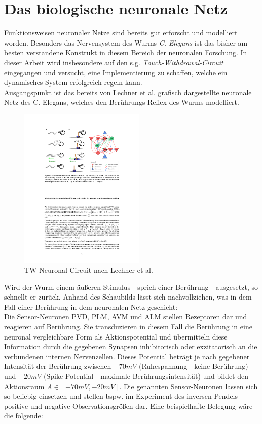 \section{Das biologische neuronale Netz}
\label{sec:neuro_netz}
	Funktionsweisen neuronaler Netze sind bereits gut erforscht und modelliert worden. Besonders das Nervensystem des Wurms \textit{C. Elegans} \cite{CElegans} ist das bisher am besten verstandene Konstrukt in diesem Bereich der neuronalen Forschung. In dieser Arbeit wird insbesondere auf den s.g. \textit{Touch-Withdrawal-Circuit} eingegangen und versucht, eine Implementierung zu schaffen, welche ein dynamisches System erfolgreich regeln kann.\\
	Ausgangspunkt ist das bereits von Lechner et al. \cite{WormLevelRL} grafisch dargestellte neuronale Netz des C. Elegans, welches den Berührungs-Reflex des Wurms modelliert.
	\begin{figure}[!h] %
		\centering
		\includegraphics[width=6cm]{figures/chap_neuron/Orig_TW_Circuit.pdf}
		\caption{TW-Neuronal-Circuit nach Lechner et al. \cite{WormLevelRL}}
		\label{fig:01_TW-Circuit}
	\end{figure}
	Wird der Wurm einem äußeren Stimulus - sprich einer Berührung - ausgesetzt, so schnellt er zurück. Anhand des Schaubilds lässt sich nachvollziehen, was in dem Fall einer Berührung in dem neuronalen Netz geschieht:\\
	Die Sensor-Neuronen PVD, PLM, AVM und ALM stellen Rezeptoren dar und reagieren auf Berührung. Sie transduzieren in diesem Fall die Berührung in eine neuronal vergleichbare Form als Aktionspotential und übermitteln diese Information durch die gegebenen Synapsen inhibitorisch oder exzitatorisch an die verbundenen internen Nervenzellen. Dieses Potential beträgt je nach gegebener Intensität der Berührung zwischen $-70mV$ (Ruhespannung - keine Berührung) und $-20mV$ (Spike-Potential - maximale Berührungsintensität) und bildet den Aktionsraum $A\in[-70mV, -20mV]$. Die genannten Sensor-Neuronen lassen sich so beliebig einsetzen und stellen bspw. im Experiment des inversen Pendels positive und negative Observationsgrößen dar. Eine beispielhafte Belegung wäre die folgende:
